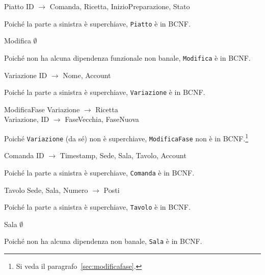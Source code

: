 \begin{samepage}
\begin{funcdep}{Piatto}
    ID $\to$ Comanda, Ricetta, InizioPreparazione, Stato
\end{funcdep}
Poiché la parte a sinistra è superchiave, {\tt Piatto} è in BCNF.
\end{samepage}

\begin{samepage}
\begin{funcdep}{Modifica}
    $\emptyset$
\end{funcdep}
Poiché non ha alcuna dipendenza funzionale non banale, {\tt Modifica} è in BCNF.
\end{samepage}

\begin{samepage}
\begin{funcdep}{Variazione}
    ID $\to$ Nome, Account
\end{funcdep}
Poiché la parte a sinistra è superchiave, {\tt Variazione} è in BCNF.
\end{samepage}

\begin{samepage}
\begin{funcdep}{ModificaFase}
    Variazione $\to$ Ricetta\\
    Variazione, ID $\to$ FaseVecchia, FaseNuova
\end{funcdep}
Poiché {\tt Variazione} (da sé) non è superchiave, {\tt ModificaFase} non è in BCNF.\footnote{Si veda il paragrafo~\vref{sec:modificafase}.}
\end{samepage}

\begin{samepage}
\begin{funcdep}{Comanda}
    ID $\to$ Timestamp, Sede, Sala, Tavolo, Account
\end{funcdep}
Poiché la parte a sinistra è superchiave, {\tt Comanda} è in BCNF.
\end{samepage}

\begin{samepage}
\begin{funcdep}{Tavolo}
    Sede, Sala, Numero $\to$ Posti
\end{funcdep}
Poiché la parte a sinistra è superchiave, {\tt Tavolo} è in BCNF.
\end{samepage}

\begin{samepage}
\begin{funcdep}{Sala}
    $\emptyset$
\end{funcdep}
Poiché non ha alcuna dipendenza non banale, {\tt Sala} è in BCNF.
\end{samepage}


